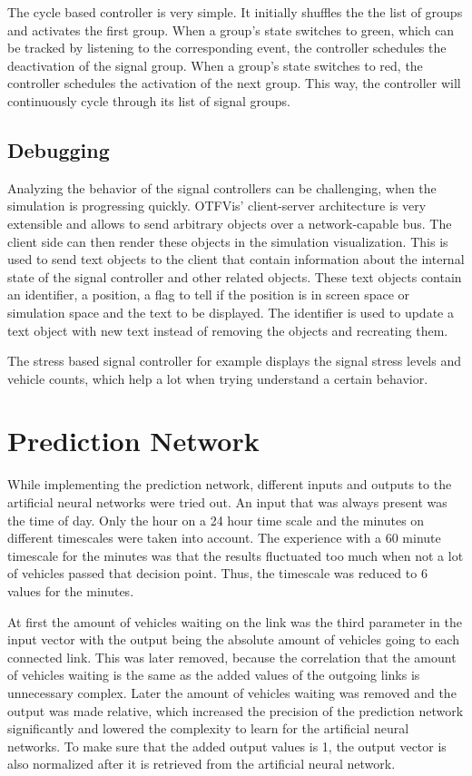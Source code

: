 The cycle based controller is very simple. It initially shuffles the the list of groups and activates the first group. When a group's state switches to green, which can be tracked by listening to the corresponding event, the controller schedules the deactivation of the signal group. When a group's state switches to red, the controller schedules the activation of the next group. This way, the controller will continuously cycle through its list of signal groups.

\subsection*{Debugging}

Analyzing the behavior of the signal controllers can be challenging, when the simulation is progressing quickly. OTFVis' client-server architecture is very extensible and allows to send arbitrary objects over a network-capable bus. The client side can then render these objects in the simulation visualization. This is used to send text objects to the client that contain information about the internal state of the signal controller and other related objects. These text objects contain an identifier, a position, a flag to tell if the position is in screen space or simulation space and the text to be displayed. The identifier is used to update a text object with new text instead of removing the objects and recreating them.

The stress based signal controller for example displays the signal stress levels and vehicle counts, which help a lot when trying understand a certain behavior.

\section{Prediction Network}

While implementing the prediction network, different inputs and outputs to the artificial neural networks were tried out. An input that was always present was the time of day. Only the hour on a 24 hour time scale and the minutes on different timescales were taken into account. The experience with a 60 minute timescale for the minutes was that the results fluctuated too much when not a lot of vehicles passed that decision point. Thus, the timescale was reduced to 6 values for the minutes.

At first the amount of vehicles waiting on the link was the third parameter in the input vector with the output being the absolute amount of vehicles going to each connected link. This was later removed, because the correlation that the amount of vehicles waiting is the same as the added values of the outgoing links is unnecessary complex. Later the amount of vehicles waiting was removed and the output was made relative, which increased the precision of the prediction network significantly and lowered the complexity to learn for the artificial neural networks. To make sure that the added output values is 1, the output vector is also normalized after it is retrieved from the artificial neural network.

